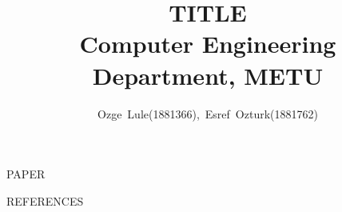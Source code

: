 \documentclass[12pt,journal,compsoc]{IEEEtran}
\begin{document}
\title{
	\huge TITLE \\     
    \Large Computer Engineering Department, METU}


\author{\normalsize Ozge~Lule(1881366),~Esref~Ozturk(1881762)}




\maketitle

\IEEEdisplaynontitleabstractindextext

\IEEEpeerreviewmaketitle


PAPER


\begin{thebibliography}{1}

REFERENCES

\end{thebibliography}
\end{document}
